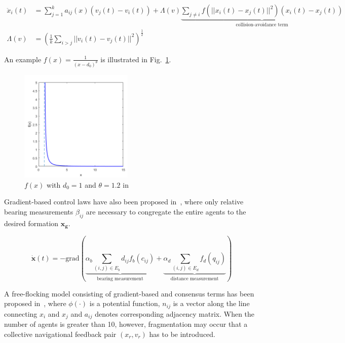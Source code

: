 \begin{equation}\label{eq:dong_aij}
\begin{aligned}
\ddot{x}_i(t)&=\sum^k_{j=1}a_{ij}(x)(v_j(t)-v_i(t))+\Lambda(v)\underbrace{\sum_{j\neq i}f(||x_i(t)-x_j(t)||^2)(x_i(t)-x_j(t))}_{\text{collision-avoidance term}}\\
\Lambda(v)&=(\frac{1}{k}\sum_{i>j}||v_i(t)-v_j(t)||^2)^{\frac{1}{2}}
\end{aligned}
\end{equation}

An example $f(x)=\frac{1}{(x-d_0)^{\theta}}$ is illustrated in Fig.~\ref{fig:dong_f}.

\begin{figure}[htb]
  \centering
  \includegraphics[width=0.48\textwidth]{figure/chapter_2/dong_f.png}
  \caption{$f(x)$ with $d_0=1$ and $\theta=1.2$ in ~\cite{CuckerDong2010}}
  \label{fig:dong_f}
\end{figure}

Gradient-based control laws have also been proposed in~\cite{Bearing2016}, where only relative bearing measurements $\beta_{ij}$ are necessary to congregate the entire agents to the desired formation $\mathbf{x_g}$.

\begin{equation}\label{eq:bearing}
\dot{\mathbf{x}}(t)=-\text{grad}(\underbrace{\alpha_b\sum_{(i,j)\in E_b}d_{ij}f_b(c_{ij})}_{\text{bearing measurement}}+\underbrace{\alpha_d\sum_{(i,j)\in E_d}f_d(q_{ij})}_{\text{distance measurement}})
\end{equation}

A free-flocking model consisting of gradient-based and consensus terms has been proposed in~\cite{Saber2004}, where $\phi(\cdot)$ is a potential function, $n_{ij}$ is a vector along the line connecting $x_i$ and $x_j$ and $a_{ij}$ denotes corresponding adjacency matrix. When the number of agents is greater than 10, however, fragmentation may occur that a collective navigational feedback pair $(x_r, v_r)$ has to be introduced.

